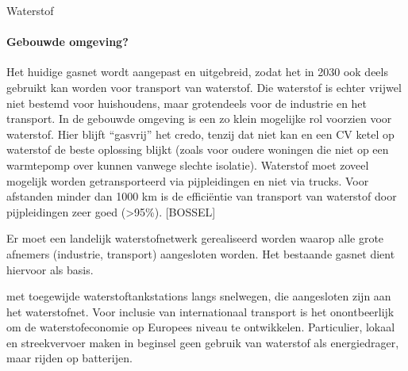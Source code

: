 \begin{voorstel}{Waterstof}
\begin{multicols*}{2}
\begin{overwegingen}
\paragraph{Gebouwde omgeving?}
Het huidige gasnet wordt aangepast en uitgebreid, zodat het in 2030 ook deels gebruikt kan worden voor transport van waterstof. Die waterstof is echter vrijwel niet bestemd voor huishoudens, maar grotendeels voor de industrie en het transport. In de gebouwde omgeving is een zo klein mogelijke rol voorzien voor waterstof. Hier blijft “gasvrij” het credo, tenzij dat niet kan en een CV ketel op waterstof de beste oplossing blijkt (zoals voor oudere woningen die niet op een warmtepomp over kunnen vanwege slechte isolatie). Waterstof moet zoveel mogelijk worden getransporteerd via pijpleidingen en niet via trucks. Voor afstanden minder dan 1000 km is de efficiëntie van transport van waterstof door pijpleidingen zeer goed (>95\%). [BOSSEL]


\end{overwegingen}

\begin{aanbevelingen}

Er moet een landelijk waterstofnetwerk gerealiseerd worden waarop alle grote afnemers (industrie, transport) aangesloten worden. Het bestaande gasnet dient hiervoor als basis.

 met toegewijde waterstoftankstations langs snelwegen, die aangesloten zijn aan het waterstofnet. Voor inclusie van internationaal transport is het onontbeerlijk om de waterstofeconomie op Europees niveau te ontwikkelen. Particulier, lokaal en streekvervoer maken in beginsel geen gebruik van waterstof als energiedrager, maar rijden op batterijen.


\end{aanbevelingen}
\end{multicols*}
\end{voorstel}
